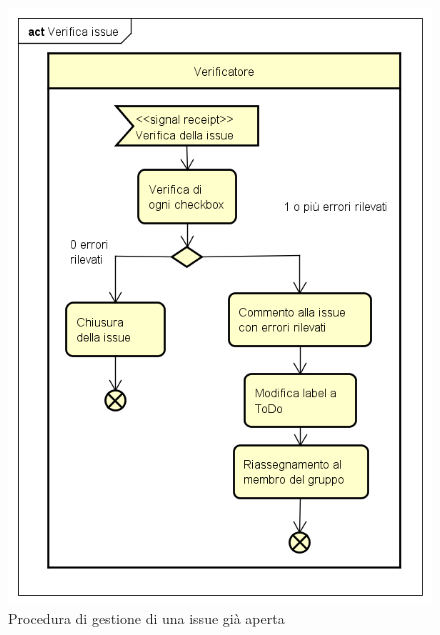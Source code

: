 \documentclass[../NormeProgetto.text]{subfiles}
\begin{document}
			\begin{figure}[H]
					\centering
					\includegraphics[scale=0.5,  width=\textwidth]{sections/img/verificaIssue.png}
					\caption{Procedura di gestione di una issue già aperta}\label{fig:Procedura di gestione di una issue già aperta} 
				\end{figure}				
				
\end{document}
